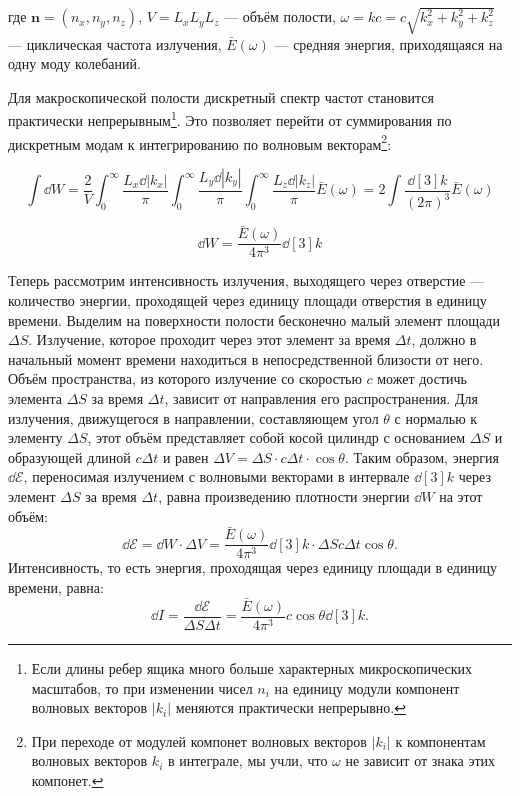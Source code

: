 \documentclass[a4paper, 12pt]{article}
\begin{document}
где $\bm{n} = (n_x, n_y, n_z)$, $V = L_x L_y L_z$ — объём полости, $\omega = kc = c\sqrt{k_x^2 + k_y^2 + k_z^2}$ — циклическая частота излучения, $\bar{E}(\omega)$ — средняя энергия, приходящаяся на одну моду колебаний.

Для макроскопической полости дискретный спектр частот становится практически
непрерывным\footnote{Если длины ребер ящика много больше характерных микроскопических
масштабов, то при изменении чисел $n_i$ на единицу модули компонент волновых
векторов $|k_i|$ меняются практически непрерывно.}. Это позволяет перейти от
суммирования по дискретным модам к интегрированию по волновым
векторам\footnote{При переходе от модулей компонет волновых векторов $|k_i|$ к
  компонентам волновых векторов $k_i$ в интеграле, мы учли, что $\omega$ не зависит
от знака этих компонет.}:

\[
\int \dd{W} = \frac{2}{V} \int_0^\infty \frac{L_x \dd{|k_x|}}{\pi} \int_0^\infty \frac{L_y \dd{|k_y|}}{\pi} \int_0^\infty \frac{L_z \dd{|k_z|}}{\pi} \bar{E}(\omega) = 2 \int \frac{\dd[3]{k}}{(2\pi)^3} \bar{E}(\omega)
\]

\[
\dd{W} = \frac{\bar{E}(\omega)}{4\pi^3} \dd[3]{k}
\]

Теперь рассмотрим интенсивность излучения, выходящего через отверстие —
количество энергии, проходящей через единицу площади отверстия в единицу
времени. Выделим на поверхности полости бесконечно малый элемент площади $\Delta S$.
Излучение, которое проходит через этот элемент за время $\Delta t$, должно в
начальный момент времени находиться в непосредственной близости от него. Объём
пространства, из которого излучение со скоростью $c$ может достичь элемента
$\Delta S$ за время $\Delta t$, зависит от направления его распространения. Для излучения,
движущегося в направлении, составляющем угол $\theta$ с нормалью к элементу
$\Delta S$, этот объём представляет собой косой цилиндр с основанием $\Delta S$ и
образующей длиной $c\Delta t$ и равен $\Delta V = \Delta S \cdot c\Delta t \cdot \cos\theta$. Таким образом,
энергия $\dd{\mathcal{E}}$, переносимая излучением с волновыми векторами в интервале
$\dd[3]{k}$ через элемент $\Delta S$ за время $\Delta t$, равна произведению плотности
энергии $\dd{W}$ на этот объём:
\[
\dd{\mathcal{E}} = \dd{W} \cdot \Delta V = \frac{\bar{E}(\omega)}{4\pi^3} \dd[3]{k} \cdot \Delta S c \Delta t \cos\theta.
\]
Интенсивность, то есть энергия, проходящая через единицу площади в единицу времени, равна:
\[
\dd{I} = \frac{\dd{\mathcal{E}}}{\Delta S \Delta t} = \frac{\bar{E}(\omega)}{4\pi^3} c \cos\theta \dd[3]{k}.
\]
\end{document}
